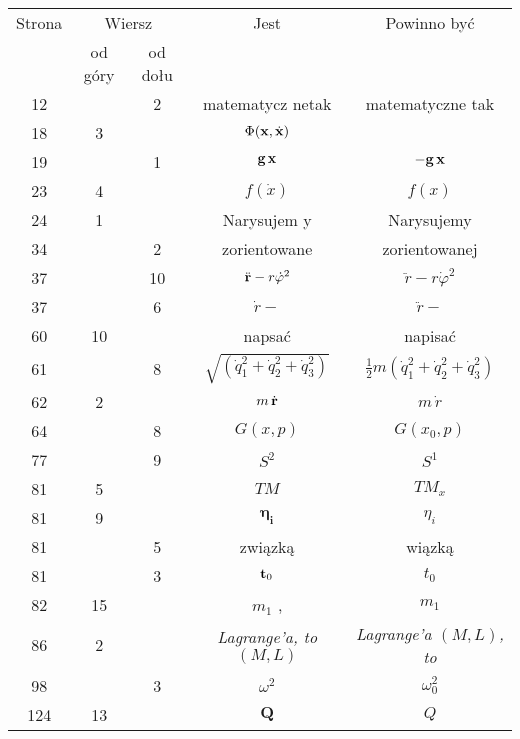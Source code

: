\documentclass[a4paper,11pt]{article}
\numberwithin{equation}{section}
\begin{document}
\begin{center}

  \begin{tabular}{|c|c|c|c|c|}
    \hline
    Strona & \multicolumn{2}{c|}{Wiersz} & Jest
                              & Powinno być \\ \cline{2-3}
    & od góry & od dołu & & \\
    \hline
    12  & &  2 & matematycz netak & matematyczne tak \\
    18  &  3 & & $\Phi( \mathbf{x}, \dot{ \mathbf{x} } )$
    & %
    \\
    19  & &  1 & $\mathbf{g}\, \mathbf{x}$ & $-\mathbf{g}\, \mathbf{x}$ \\
    23  &  4 & & $f( \dot{ x } )$ & $f( x )$ \\
    24  &  1 & & Narysujem y & Narysujemy \\
    34  & &  2 & zorientowane & zorientowanej \\
    37  & & 10 & $\ddot{ \mathbf{r} } - r \dot{ \varphi }^{ 2 }$
           & $\ddot{ r } - r \dot{ \varphi }^{ 2 }$ \\
    37  & &  6 & $\dot{ r } -$ & $\ddot{ r } -$ \\
    60  & 10 & & napsać & napisać \\
    61  & &  8 & $\sqrt{ ( \dot{ q }_{ 1 }^{ 2 } + \dot{ q }_{ 2 }^{ 2 }
                 + \dot{ q }_{ 3 }^{ 2 } ) }$
           & $\frac{ 1 }{ 2 } m ( \dot{ q }_{ 1 }^{ 2 } + \dot{ q }_{ 2 }^{ 2 }
             + \dot{ q }_{ 3 }^{ 2 } )$ \\
    62  &  2 & & $m\, \dot{ \mathbf{r} }$ & $m\, \dot{ r }$ \\
    64  & &  8 & $G( x, p )$ & $G( x_{ 0 }, p )$ \\
    77  & &  9 & $S^{ 2 }$ & $S^{ 1 }$ \\
    81  &  5 & & $TM$ & $TM_{ x }$ \\
    81  &  9 & & $\mathbf{ \eta_{ i } }$ & $\eta_{ i }$ \\
    81  & &  5 & związką & wiązką \\
    81  & &  3 & $\mathbf{t}_{ 0 }$ & $t_{ 0 }$ \\
    82  & 15 & & $m_{ 1 }${  }, & $m_{ 1 }$ \\
    86  &  2 & & \textit{Lagrange’a, to $( M, L )$}
           & \textit{Lagrange’a $( M, L )$, to} \\
    98  & &  3 & $\omega^{ 2 }$ & $\omega_{ 0 }^{ 2 }$ \\
    124 & 13 & & $\mathbf{Q}$ & $Q$ \\

\end{tabular}
\end{center}
\end{document}
